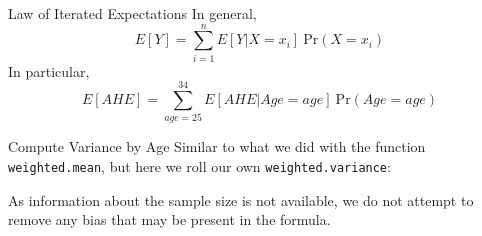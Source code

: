 \documentclass[
  11pt,
  ignorenonframetext,
  svgnames, handout, t]{beamer}
\newenvironment{Shaded}{\begin{snugshade}}{\end{snugshade}}
\newcommand{\CommentTok}[1]{\textcolor[rgb]{0.56,0.35,0.01}{\textit{#1}}}
\newcommand{\ControlFlowTok}[1]{\textcolor[rgb]{0.13,0.29,0.53}{\textbf{#1}}}
\newcommand{\DecValTok}[1]{\textcolor[rgb]{0.00,0.00,0.81}{#1}}
\newcommand{\FunctionTok}[1]{\textcolor[rgb]{0.00,0.00,0.00}{#1}}
\newcommand{\NormalTok}[1]{#1}
\newcommand{\OtherTok}[1]{\textcolor[rgb]{0.56,0.35,0.01}{#1}}
\newcommand{\SpecialCharTok}[1]{\textcolor[rgb]{0.00,0.00,0.00}{#1}}
\begin{document}
\begin{frame}{Law of Iterated Expectations}
\protect\hypertarget{law-of-iterated-expectations}{}
In general, \[
E[Y] = \sum_{i=1}^n E[Y|X=x_i]\ \text{Pr}(X=x_i)
\] In particular, \[
E[AHE] = \sum_{age=25}^{34} E[AHE|Age=age]\ \text{Pr}(Age=age)
\]
\end{frame}

\begin{frame}[fragile]{Compute Variance by Age}
\protect\hypertarget{compute-variance-by-age}{}
Similar to what we did with the function \texttt{weighted.mean}, but
here we roll our own \texttt{weighted.variance}:

\footnotesize

\begin{Shaded}
\end{Shaded}

\normalsize As information about the sample size is not available, we do
not attempt to remove any bias that may be present in the formula.
\end{frame}
\end{document}
